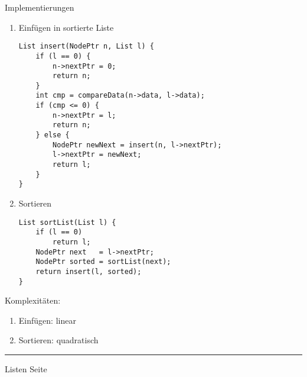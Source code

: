 \begin{slide}{}
\normalsize

\begin{center}
Implementierungen
\end{center}
\vspace*{0.5cm}

\footnotesize
\begin{enumerate}
\item Einf\"ugen in sortierte Liste

\begin{verbatim}
List insert(NodePtr n, List l) {
    if (l == 0) {
        n->nextPtr = 0;
        return n;
    }
    int cmp = compareData(n->data, l->data);
    if (cmp <= 0) {
        n->nextPtr = l;
        return n;
    } else {
        NodePtr newNext = insert(n, l->nextPtr);
        l->nextPtr = newNext;
        return l;
    }
}
\end{verbatim}

\item Sortieren

\begin{verbatim}
List sortList(List l) {
    if (l == 0)
        return l;
    NodePtr next   = l->nextPtr;
    NodePtr sorted = sortList(next);
    return insert(l, sorted);
}
\end{verbatim}
\end{enumerate}
Komplexit\"aten:
\begin{enumerate}
\item Einf\"ugen: linear
\item Sortieren: quadratisch
\end{enumerate}


\vspace*{\fill}
\tiny \addtocounter{mypage}{1}
\rule{17cm}{1mm}
Listen  \hspace*{\fill} Seite 
\end{slide}


